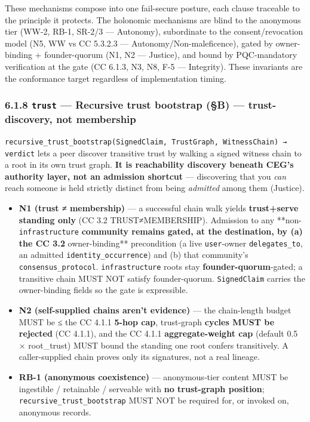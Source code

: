 \documentclass[11pt]{article}
\begin{document}
These mechanisms compose into one fail-secure posture, each clause traceable to the principle it protects. The holonomic mechanisms are blind to the anonymous tier (WW-2, RB-1, SR-2/3 — Autonomy), subordinate to the consent/revocation model (N5, WW vs CC 5.3.2.3 — Autonomy/Non-maleficence), gated by owner-binding + founder-quorum (N1, N2 — Justice), and bound by PQC-mandatory verification at the gate (CC 6.1.3, N3, N8, F-5 — Integrity). These invariants are the conformance target regardless of implementation timing.


\subsubsection*{6.1.8 \texttt{trust} — Recursive trust bootstrap (§B) — trust-discovery, not membership}


\texttt{recursive\_trust\_bootstrap(SignedClaim, TrustGraph, WitnessChain) → verdict} lets a peer discover transitive trust by walking a signed witness chain to a root in its own trust graph. \textbf{It is reachability discovery beneath CEG's authority layer, not an admission shortcut} — discovering that you \textit{can} reach someone is held strictly distinct from being \textit{admitted} among them (Justice).


\begin{itemize}\setlength\itemsep{0pt}
\item \textbf{N1 (trust ≠ membership)} — a successful chain walk yields \textbf{trust+serve standing only} (CC 3.2 TRUST≠MEMBERSHIP). Admission to any **non-\texttt{infrastructure}\textbf{ community remains gated, at the destination, by (a) the CC 3.2 }owner-binding** precondition (a live \texttt{user}-owner \texttt{delegates\_to}, an admitted \texttt{identity\_occurrence}) and (b) that community's \texttt{consensus\_protocol}. \texttt{infrastructure} roots stay \textbf{founder-quorum}-gated; a transitive chain MUST NOT satisfy founder-quorum. \texttt{SignedClaim} carries the owner-binding fields so the gate is expressible.
\item \textbf{N2 (self-supplied chains aren't evidence)} — the chain-length budget MUST be ≤ the CC 4.1.1 \textbf{5-hop cap}, trust-graph \textbf{cycles MUST be rejected} (CC 4.1.1), and the CC 4.1.1 \textbf{aggregate-weight cap} (default 0.5 × root\_trust) MUST bound the standing one root confers transitively. A caller-supplied chain proves only its signatures, not a real lineage.
\item \textbf{RB-1 (anonymous coexistence)} — anonymous-tier content MUST be ingestible / retainable / serveable with \textbf{no trust-graph position}; \texttt{recursive\_trust\_bootstrap} MUST NOT be required for, or invoked on, anonymous records.
\end{itemize}
\end{document}
